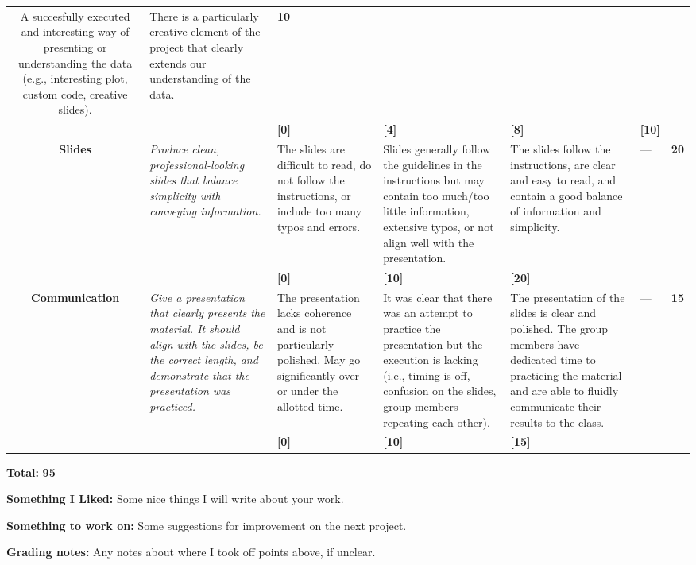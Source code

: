 \documentclass[10pt, a4paper]{article}
\makeatletter
\newcommand{\magenta}[1]{\textcolor{solarized@magenta}{#1}}
\makeatother
\begin{document}
\begin{tabular}{C | L | L | L | L | L | E}
 A succesfully executed and interesting way of presenting or understanding the data (e.g., interesting plot, custom code, creative slides). &
 There is a particularly creative element of the project that clearly extends our understanding of the data. &
  {\large \textbf{\magenta{10}}} \\
&&\textbf{[0]}&\textbf{[4]}&\textbf{[8]}&\textbf{[10]}& \\
 \hline
 \textbf{Slides} & \textit{Produce clean, professional-looking slides that balance simplicity with conveying information.} &
 The slides are difficult to read, do not follow the instructions, or include too many typos and errors. & 
 Slides generally follow the guidelines in the instructions but may contain too much/too little information, extensive typos, or not align well with the presentation. &
 The slides follow the instructions, are clear and easy to read, and contain a good balance of information and simplicity.
 &
 --- &
  {\large \textbf{\magenta{20}}} \\
&&\textbf{[0]}&\textbf{[10]}&\textbf{[20]}&& \\
 \hline
 \textbf{Communication} & \textit{Give a presentation that clearly presents the material. It should align with the slides, be the correct length, and demonstrate that the presentation was practiced.} &
 The presentation lacks coherence and is not particularly polished. May go significantly over or under the allotted time. & 
 It was clear that there was an attempt to practice the presentation but the execution is lacking (i.e., timing is off, confusion on the slides, group members repeating each other). &
 The presentation of the slides is clear and polished. The group members have dedicated time to practicing the material and are able to fluidly communicate their results to the class. &
 --- &
  {\large \textbf{\magenta{15}}} \\
&&\textbf{[0]}&\textbf{[10]}&\textbf{[15]}&& \\
 \hline
\end{tabular}

\hfill \textbf{Total:} {\large \textbf{\magenta{95}}}

\textbf{Something I Liked:} Some nice things I will write about your work.

\textbf{Something to work on:} Some suggestions for improvement on the next project.

\textbf{Grading notes:} Any notes about where I took off points above, if unclear.
\end{document}
